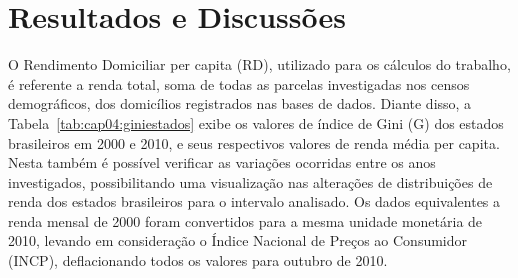 \newpage
\section{Resultados e Discussões}\label{cap04:resultados}

O Rendimento Domiciliar per capita (RD), utilizado para os cálculos do trabalho, é referente a renda total, soma de todas as parcelas investigadas nos censos demográficos, dos domicílios registrados nas bases de dados. Diante disso, a Tabela~\ref{tab:cap04:giniestados} exibe os valores de índice de Gini (G) dos estados brasileiros em 2000 e 2010, e seus respectivos valores de renda média per capita. Nesta também é possível verificar as variações ocorridas entre os anos investigados, possibilitando uma visualização nas alterações de distribuições de renda dos estados brasileiros para o intervalo analisado. Os dados equivalentes a renda mensal de 2000 foram convertidos para a mesma unidade monetária de 2010, levando em consideração o Índice Nacional de Preços ao Consumidor (INCP), deflacionando todos os valores para outubro de 2010.

